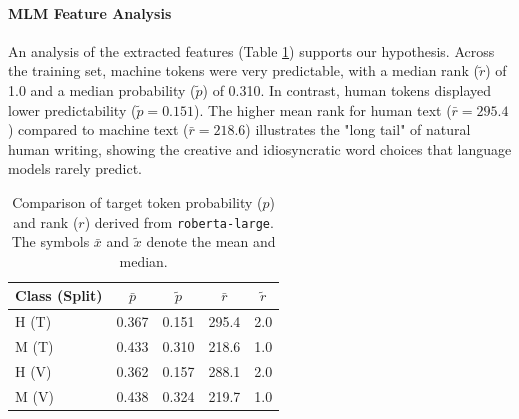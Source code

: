 \documentclass[11pt]{article}
\begin{document}
\paragraph{MLM Feature Analysis}



An analysis of the extracted features (Table \ref{tab:mlm_stats}) supports our hypothesis.
Across the training set, machine tokens were very predictable, with a median rank ($\tilde{r}$) of 1.0 and a
median probability ($\tilde{p}$) of 0.310. In contrast, human tokens displayed lower predictability ($\tilde{p}=0.151$).
The higher mean rank for human text ($\bar{r}=295.4$) compared to machine text ($\bar{r}=218.6$)
illustrates the "long tail" of natural human writing, showing the creative and idiosyncratic word choices that language
models rarely predict.

\begin{table}
    \centering
    \small
    \begin{tabular}{lcccc}
        \hline
        \textbf{Class (Split)} & $\bar{p}$ & $\tilde{p}$ & $\bar{r}$ & $\tilde{r}$ \\
        \hline
        H (T)                  & 0.367     & 0.151       & 295.4     & 2.0         \\
        M (T)                  & 0.433     & 0.310       & 218.6     & 1.0         \\
        \hline
        H (V)                  & 0.362     & 0.157       & 288.1     & 2.0         \\
        M (V)                  & 0.438     & 0.324       & 219.7     & 1.0         \\
        \hline
    \end{tabular}
    \caption{Comparison of target token probability ($p$) and rank ($r$) derived from \texttt{roberta-large}. The symbols $\bar{x}$ and $\tilde{x}$ denote the mean and median.}
    \label{tab:mlm_stats}
\end{table}
\end{document}
